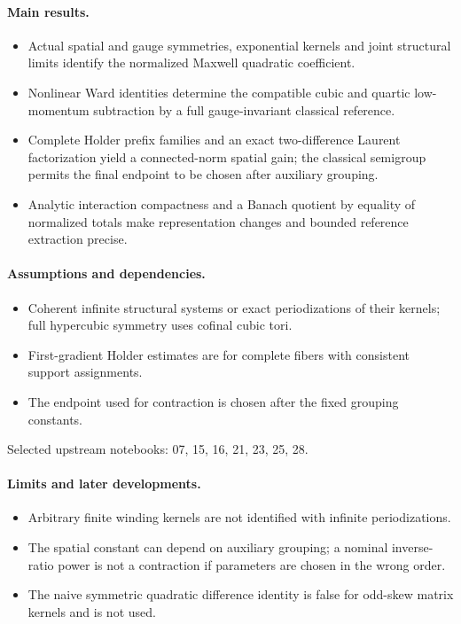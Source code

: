 \paragraph{Main results.}
\begin{itemize}
\item Actual spatial and gauge symmetries, exponential kernels and joint structural limits identify the normalized Maxwell quadratic coefficient.
\item Nonlinear Ward identities determine the compatible cubic and quartic low-momentum subtraction by a full gauge-invariant classical reference.
\item Complete Holder prefix families and an exact two-difference Laurent factorization yield a connected-norm spatial gain; the classical semigroup permits the final endpoint to be chosen after auxiliary grouping.
\item Analytic interaction compactness and a Banach quotient by equality of normalized totals make representation changes and bounded reference extraction precise.
\end{itemize}

\paragraph{Assumptions and dependencies.}
\begin{itemize}
\item Coherent infinite structural systems or exact periodizations of their kernels; full hypercubic symmetry uses cofinal cubic tori.
\item First-gradient Holder estimates are for complete fibers with consistent support assignments.
\item The endpoint used for contraction is chosen after the fixed grouping constants.
\end{itemize}

Selected upstream notebooks: 07, 15, 16, 21, 23, 25, 28.\par

\paragraph{Limits and later developments.}
\begin{itemize}
\item Arbitrary finite winding kernels are not identified with infinite periodizations.
\item The spatial constant can depend on auxiliary grouping; a nominal inverse-ratio power is not a contraction if parameters are chosen in the wrong order.
\item The naive symmetric quadratic difference identity is false for odd-skew matrix kernels and is not used.
\end{itemize}

